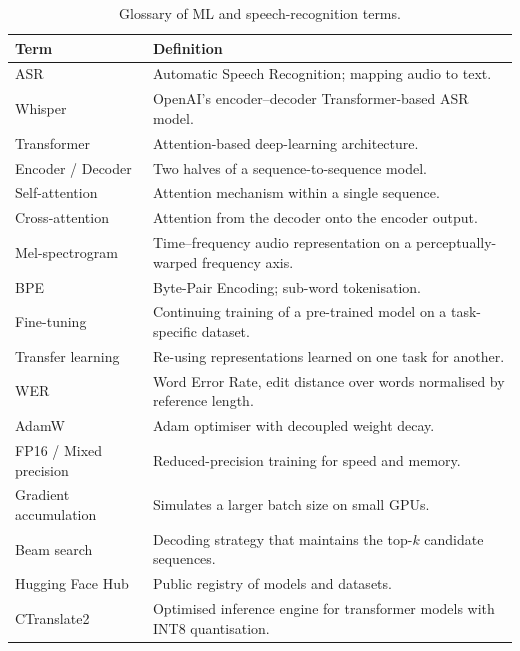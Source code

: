 \begin{table}[H]
  \centering
  \caption{Glossary of ML and speech-recognition terms.}
  \label{tab:mt_glossary_ml}
  \renewcommand{\arraystretch}{1.3}
  \begin{tabular}{lp{9cm}}
    \toprule
    \textbf{Term} & \textbf{Definition} \\
    \midrule
    ASR                  & Automatic Speech Recognition; mapping audio to text. \\
    Whisper              & OpenAI's encoder--decoder Transformer-based ASR model. \\
    Transformer          & Attention-based deep-learning architecture. \\
    Encoder / Decoder    & Two halves of a sequence-to-sequence model. \\
    Self-attention       & Attention mechanism within a single sequence. \\
    Cross-attention      & Attention from the decoder onto the encoder
                           output. \\
    Mel-spectrogram      & Time--frequency audio representation on a
                           perceptually-warped frequency axis. \\
    BPE                  & Byte-Pair Encoding; sub-word tokenisation. \\
    Fine-tuning          & Continuing training of a pre-trained model on
                           a task-specific dataset. \\
    Transfer learning    & Re-using representations learned on one task
                           for another. \\
    WER                  & Word Error Rate, edit distance over words
                           normalised by reference length. \\
    AdamW                & Adam optimiser with decoupled weight decay. \\
    FP16 / Mixed precision & Reduced-precision training for speed and
                            memory. \\
    Gradient accumulation & Simulates a larger batch size on small GPUs. \\
    Beam search          & Decoding strategy that maintains the
                           top-$k$ candidate sequences. \\
    Hugging Face Hub     & Public registry of models and datasets. \\
    CTranslate2          & Optimised inference engine for transformer
                           models with INT8 quantisation. \\
    \bottomrule
  \end{tabular}
\end{table}
